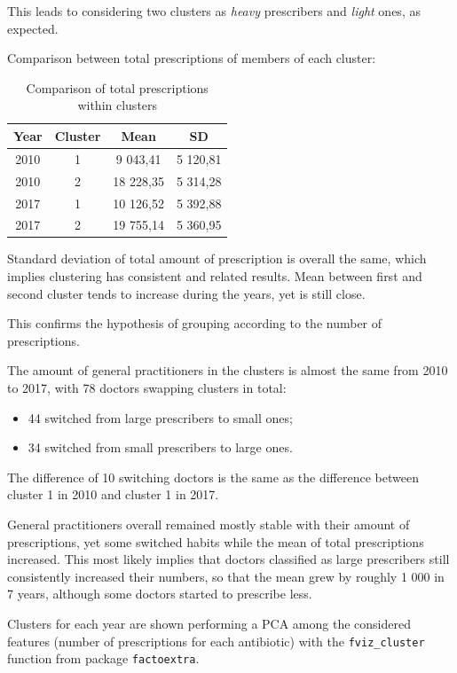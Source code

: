 This leads to considering two clusters as \textit{heavy} prescribers and \textit{light} ones, as expected.

Comparison between total prescriptions of members of each cluster:
\begin{table}[h]
	\centering
	\begin{tabular}{c|c|c|c}
		\textbf{Year} & \textbf{Cluster} & \textbf{Mean} & \textbf{SD} \\
		\hline
		2010 & 1 & 9 043,41 & 5 120,81 \\
		\hline
		2010 & 2 & 18 228,35 & 5 314,28 \\
		\hline
		2017 & 1 & 10 126,52 & 5 392,88 \\
		\hline
		2017 & 2 & 19 755,14 & 5 360,95 \\
	\end{tabular}
\caption{\small Comparison of total prescriptions within clusters}
\end{table}

Standard deviation of total amount of prescription is overall the same, which implies clustering has consistent and related results. Mean between first and second cluster tends to increase during the years, yet is still close.

This confirms the hypothesis of grouping according to the number of prescriptions.

The amount of general practitioners in the clusters is almost the same from 2010 to 2017, with 78 doctors swapping clusters in total:
\begin{itemize}
	\item 44 switched from large prescribers to small ones;
	\item 34 switched from small prescribers to large ones.
\end{itemize}
The difference of 10 switching doctors is the same as the difference between cluster 1 in 2010 and cluster 1 in 2017.

General practitioners overall remained mostly stable with their amount of prescriptions, yet some switched habits while the mean of total prescriptions increased. This most likely implies that doctors classified as large prescribers still consistently increased their numbers, so that the mean grew by roughly 1 000 in 7 years, although some doctors started to prescribe less.

Clusters for each year are shown performing a PCA among the considered features (number of prescriptions for each antibiotic) with the \texttt{fviz\_cluster} function from package \texttt{factoextra}. 

